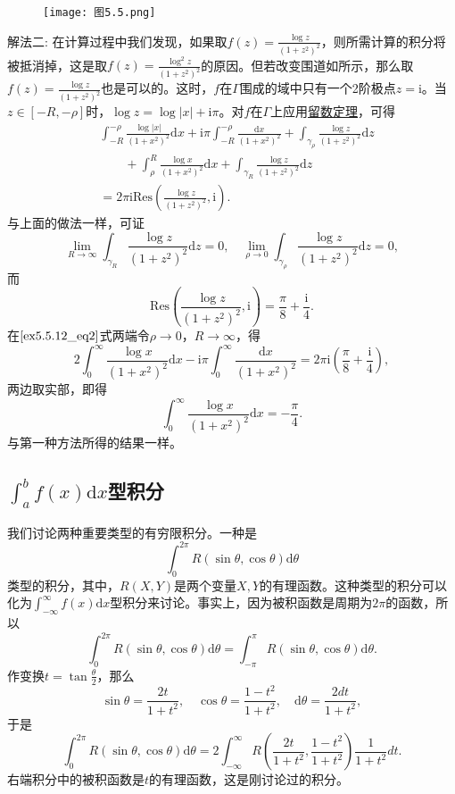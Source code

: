 \documentclass[../../main.tex]{subfiles}
\begin{document}
\begin{solution}
\begin{figure}[H]
\centering
\texttt{[image: 图5.5.png]}
\caption{}
\label{figure:图5.5}
\end{figure}
{\color{blue}解法二:}
在计算过程中我们发现，如果取\( f(z) = \frac{\log z}{(1 + z^2)^2} \)，则所需计算的积分将被抵消掉，这是取\( f(z) = \frac{\log^2 z}{(1 + z^2)^2} \)的原因。但若改变围道如所示，那么取\( f(z) = \frac{\log z}{(1 + z^2)^2} \)也是可以的。这时，\( f \)在\( \Gamma \)围成的域中只有一个2阶极点\( z = \mathrm{i} \)。当\( z \in [-R, -\rho] \)时，\( \log z = \log|x| + \mathrm{i}\pi \)。对\( f \)在\( \Gamma \)上应用\hyperref[theorem:留数定理(残数定理)-定理5.4.9]{留数定理}，可得
\begin{align}
&\int_{-R}^{-\rho}{\frac{\log |x|}{(1+x^2)^2}\mathrm{d}x}+\mathrm{i}\pi \int_{-R}^{-\rho}{\frac{\mathrm{d}x}{(1+x^2)^2}}+\int_{\gamma _{\rho}}{\frac{\log z}{(1+z^2)^2}\mathrm{d}z}\nonumber
\\
&\quad \quad+\int_{\rho}^R{\frac{\log x}{(1+x^2)^2}\mathrm{d}x}+\int_{\gamma _R}{\frac{\log z}{(1+z^2)^2}\mathrm{d}z}\nonumber
\\
&=2\pi \mathrm{iRes}\left( \frac{\log z}{(1+z^2)^2},\mathrm{i} \right) . \label{ex5.5.12_eq2}
\end{align}
与上面的做法一样，可证
\[
\lim_{R \to \infty} \int_{\gamma_R} \frac{\log z}{(1 + z^2)^2} \mathrm{d}z = 0,
\quad
\lim_{\rho \to 0} \int_{\gamma_{\rho}} \frac{\log z}{(1 + z^2)^2} \mathrm{d}z = 0,
\]
而
\[
\mathrm{Res}\left( \frac{\log z}{(1 + z^2)^2}, \mathrm{i} \right) = \frac{\pi}{8} + \frac{\mathrm{i}}{4}.
\]
在\(\eqref{ex5.5.12_eq2}\)式两端令\( \rho \to 0 \)，\( R \to \infty \)，得
\[
2\int_{0}^{\infty} \frac{\log x}{(1 + x^2)^2} \mathrm{d}x - \mathrm{i}\pi \int_{0}^{\infty} \frac{\mathrm{d}x}{(1 + x^2)^2} = 2\pi \mathrm{i} \left( \frac{\pi}{8} + \frac{\mathrm{i}}{4} \right),
\]
两边取实部，即得
\[
\int_{0}^{\infty} \frac{\log x}{(1 + x^2)^2} \mathrm{d}x = -\frac{\pi}{4}.
\]
与第一种方法所得的结果一样。
\end{solution}

\subsection{$\int_a^b{f\left( x \right) \mathrm{d}x}$型积分}

我们讨论两种重要类型的有穷限积分。一种是
\[
\int_{0}^{2\pi} R(\sin\theta, \cos\theta) \mathrm{d}\theta
\]
类型的积分，其中，\( R(X, Y) \)是两个变量\( X, Y \)的有理函数。这种类型的积分可以化为\( \int_{-\infty}^{\infty} f(x) \mathrm{d}x \)型积分来讨论。事实上，因为被积函数是周期为\( 2\pi \)的函数，所以
\[
\int_{0}^{2\pi} R(\sin\theta, \cos\theta) \mathrm{d}\theta = \int_{-\pi}^{\pi} R(\sin\theta, \cos\theta) \mathrm{d}\theta.
\]
作变换\( t = \tan \frac{\theta}{2} \)，那么
\[
\sin\theta = \frac{2t}{1 + t^2},
\quad
\cos\theta = \frac{1 - t^2}{1 + t^2},
\quad
\mathrm{d}\theta = \frac{2dt}{1 + t^2},
\]
于是
\[
\int_{0}^{2\pi} R(\sin\theta, \cos\theta) \mathrm{d}\theta = 2 \int_{-\infty}^{\infty} R\left( \frac{2t}{1 + t^2}, \frac{1 - t^2}{1 + t^2} \right) \frac{1}{1 + t^2} dt.
\]
右端积分中的被积函数是\( t \)的有理函数，这是刚讨论过的积分。
\end{document}
